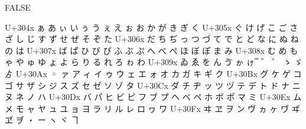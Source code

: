 \documentclass{ltjarticle}\usepackage{luatexja-adjust}
\begin{document}
\large FALSE
{\obeylines\ttfamily
U+304x          ぁ      あ      ぃ      い      ぅ      う      ぇ      え      ぉ      お      か      が      き      ぎ      く
U+305x  ぐ      け      げ      こ      ご      さ      ざ      し      じ      す      ず      せ      ぜ      そ      ぞ      た
U+306x  だ      ち      ぢ      っ      つ      づ      て      で      と      ど      な      に      ぬ      ね      の      は
U+307x  ば      ぱ      ひ      び      ぴ      ふ      ぶ      ぷ      へ      べ      ぺ      ほ      ぼ      ぽ      ま      み
U+308x  む      め      も      ゃ      や      ゅ      ゆ      ょ      よ      ら      り      る      れ      ろ      ゎ      わ
U+309x  ゐ      ゑ      を      ん      ゔ      ゕ      ゖ                      ゙        ゚        ゛      ゜      ゝ      ゞ      ゟ 
U+30Ax  ゠      ァ      ア      ィ      イ      ゥ      ウ      ェ      エ      ォ      オ      カ      ガ      キ      ギ      ク
U+30Bx  グ      ケ      ゲ      コ      ゴ      サ      ザ      シ      ジ      ス      ズ      セ      ゼ      ソ      ゾ      タ
U+30Cx  ダ      チ      ヂ      ッ      ツ      ヅ      テ      デ      ト      ド      ナ      ニ      ヌ      ネ      ノ      ハ
U+30Dx  バ      パ      ヒ      ビ      ピ      フ      ブ      プ      ヘ      ベ      ペ      ホ      ボ      ポ      マ      ミ
U+30Ex  ム      メ      モ      ャ      ヤ      ュ      ユ      ョ      ヨ      ラ      リ      ル      レ      ロ      ヮ      ワ
U+30Fx  ヰ      ヱ      ヲ      ン      ヴ      ヵ      ヶ      ヷ      ヸ      ヹ      ヺ      ・      ー      ヽ      ヾ      ヿ 
\par}
\end{document}
